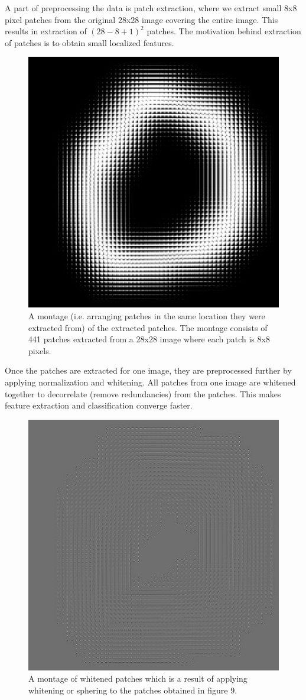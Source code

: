 \documentclass[	DIV=calc,%
				paper=a4,%
				fontsize=11pt,%
				twocolumn]{scrartcl}	 %
\begin{document}
A part of preprocessing the data is patch extraction, where we extract small 8x8 pixel patches from the original 28x28 image covering the entire image. This results in extraction of $(28-8+1)^{2}$ patches. The motivation behind extraction of patches is to obtain small localized features. 

\begin{figure}[H]
    \centering
    \includegraphics[width=0.45\linewidth]{data/sc_data/sc_mnist_patches_montage.jpg}
    \caption{A montage (i.e. arranging patches in the same location they were extracted from) of the extracted patches. The montage consists of 441 patches extracted from a 28x28 image where each patch is 8x8 pixels.}
    \label{sc_mnist_patches_montage}
\end{figure}

Once the patches are extracted for one image, they are preprocessed further by applying normalization and whitening. All patches from one image are whitened together to decorrelate (remove redundancies) from the patches. This makes feature extraction and classification converge faster.

\begin{figure}[H]
    \centering
    \includegraphics[width=0.45\linewidth]{data/sc_data/sc_mnist_whitened_patches_montage.jpg}
    \caption{A montage of whitened patches which is a result of applying whitening or sphering to the patches obtained in figure 9.}
    \label{sc_mnist_whitened_patches_montage}
\end{figure}
 
\end{document}
